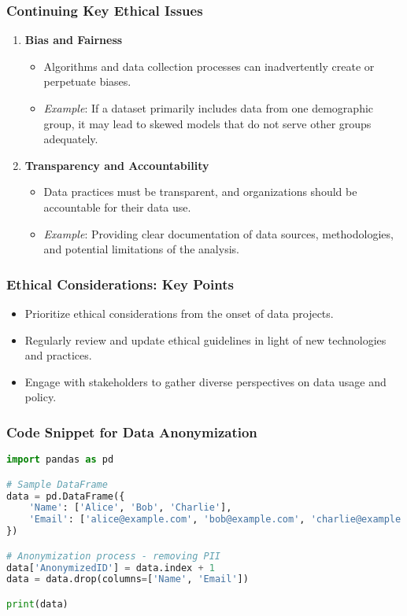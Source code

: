 \documentclass[aspectratio=169]{beamer}
\begin{document}
\begin{frame}
    \frametitle{Continuing Key Ethical Issues}
    \begin{enumerate}[resume]
        \item \textbf{Bias and Fairness}
            \begin{itemize}
                \item Algorithms and data collection processes can inadvertently create or perpetuate biases.
                \item \textit{Example}: If a dataset primarily includes data from one demographic group, it may lead to skewed models that do not serve other groups adequately.
            \end{itemize}
        \item \textbf{Transparency and Accountability}
            \begin{itemize}
                \item Data practices must be transparent, and organizations should be accountable for their data use.
                \item \textit{Example}: Providing clear documentation of data sources, methodologies, and potential limitations of the analysis.
            \end{itemize}
    \end{enumerate}
\end{frame}

\begin{frame}[fragile]
    \frametitle{Ethical Considerations: Key Points}
    \begin{itemize}
        \item Prioritize ethical considerations from the onset of data projects.
        \item Regularly review and update ethical guidelines in light of new technologies and practices.
        \item Engage with stakeholders to gather diverse perspectives on data usage and policy.
    \end{itemize}
\end{frame}

\begin{frame}[fragile]
    \frametitle{Code Snippet for Data Anonymization}
    \begin{lstlisting}[language=Python]
import pandas as pd

# Sample DataFrame
data = pd.DataFrame({
    'Name': ['Alice', 'Bob', 'Charlie'],
    'Email': ['alice@example.com', 'bob@example.com', 'charlie@example.com']
})

# Anonymization process - removing PII
data['AnonymizedID'] = data.index + 1
data = data.drop(columns=['Name', 'Email'])

print(data)
    \end{lstlisting}
\end{frame}
\end{document}
